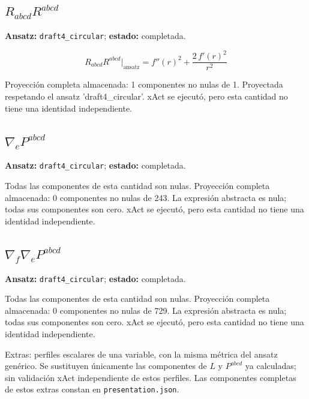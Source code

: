 \documentclass[11pt]{article}
\begin{document}
\subsection*{$ R_{abcd}R^{abcd} $}
\textbf{Ansatz:} \texttt{draft4\_circular}; \textbf{estado:} completada.\par
\begin{dmath*}[breakdepth={5}]
R_{abcd}R^{abcd}\big|_{\mathrm{ansatz}} = {f''\!\left(r\right)}^{2} + \frac{2\,{f'\!\left(r\right)}^{2}}{{r}^{2}}
\end{dmath*}
\par\smallskip
Proyección completa almacenada: 1 componentes no nulas de 1. Proyectada respetando el ansatz 'draft4\_circular'. xAct se ejecutó, pero esta cantidad no tiene una identidad independiente.\par\medskip
{}
\subsection*{$ \nabla_e P^{abcd} $}
\textbf{Ansatz:} \texttt{draft4\_circular}; \textbf{estado:} completada.\par
Todas las componentes de esta cantidad son nulas.
Proyección completa almacenada: 0 componentes no nulas de 243. La expresión abstracta es nula; todas sus componentes son cero. xAct se ejecutó, pero esta cantidad no tiene una identidad independiente.\par\medskip
{}
\subsection*{$ \nabla_f\nabla_e P^{abcd} $}
\textbf{Ansatz:} \texttt{draft4\_circular}; \textbf{estado:} completada.\par
Todas las componentes de esta cantidad son nulas.
Proyección completa almacenada: 0 componentes no nulas de 729. La expresión abstracta es nula; todas sus componentes son cero. xAct se ejecutó, pero esta cantidad no tiene una identidad independiente.\par\medskip
\par\medskip Extras: perfiles escalares de una variable, con la misma métrica del ansatz genérico. Se sustituyen únicamente las componentes de $L$ y $P^{abcd}$ ya calculadas; sin validación xAct independiente de estos perfiles. Las componentes completas de estos extras constan en \texttt{presentation.json}.
\end{document}
